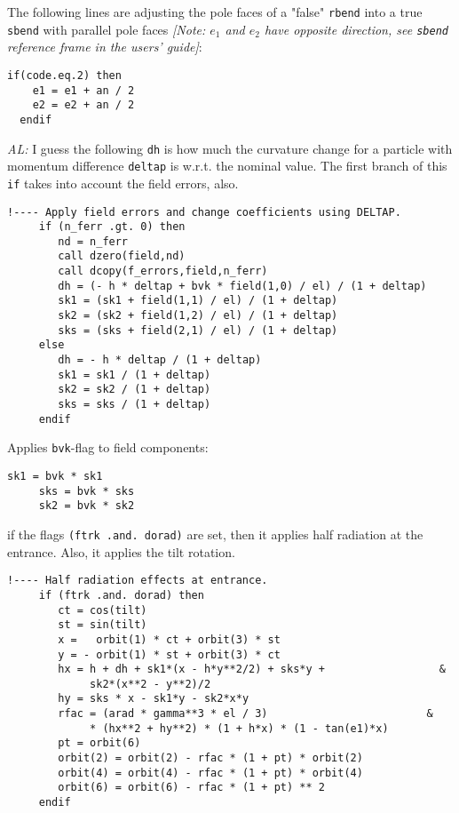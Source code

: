 \documentclass{cern-art} %
\renewcommand{\L}[1]{\lstinline[firstnumber=last]{#1}}
\begin{document}
The following lines are adjusting the pole faces of a "false" \L{rbend} into a true \L{sbend} with parallel pole faces {\em [Note: $e_1$ and $e_2$ have opposite direction, see \L{sbend} reference frame in the users' guide]}:
\begin{lstlisting}[firstnumber=last]
  if(code.eq.2) then
    e1 = e1 + an / 2
    e2 = e2 + an / 2
  endif
\end{lstlisting}
{\em AL:} I guess the following \L{dh} is how much the curvature change for a particle with momentum difference \L{deltap} is w.r.t. the nominal value. The first branch of this \L{if} takes into account the field errors, also.
  \begin{lstlisting}[firstnumber=last]
     !---- Apply field errors and change coefficients using DELTAP.
     if (n_ferr .gt. 0) then
        nd = n_ferr
        call dzero(field,nd)
        call dcopy(f_errors,field,n_ferr)
        dh = (- h * deltap + bvk * field(1,0) / el) / (1 + deltap)
        sk1 = (sk1 + field(1,1) / el) / (1 + deltap)
        sk2 = (sk2 + field(1,2) / el) / (1 + deltap)
        sks = (sks + field(2,1) / el) / (1 + deltap)
     else
        dh = - h * deltap / (1 + deltap)
        sk1 = sk1 / (1 + deltap)
        sk2 = sk2 / (1 + deltap)
        sks = sks / (1 + deltap)
     endif
  \end{lstlisting}
Applies \L{bvk}-flag to field components:
 \begin{lstlisting}[firstnumber=last]
     sk1 = bvk * sk1
     sks = bvk * sks
     sk2 = bvk * sk2
  \end{lstlisting}
  if the flags \L{(ftrk .and. dorad)} are set, then it applies half radiation at the entrance. Also, it applies the tilt rotation.
 \begin{lstlisting}[firstnumber=last]
     !---- Half radiation effects at entrance.
     if (ftrk .and. dorad) then
        ct = cos(tilt)
        st = sin(tilt)
        x =   orbit(1) * ct + orbit(3) * st
        y = - orbit(1) * st + orbit(3) * ct
        hx = h + dh + sk1*(x - h*y**2/2) + sks*y +                  &
             sk2*(x**2 - y**2)/2
        hy = sks * x - sk1*y - sk2*x*y
        rfac = (arad * gamma**3 * el / 3)                         &
             * (hx**2 + hy**2) * (1 + h*x) * (1 - tan(e1)*x)
        pt = orbit(6)
        orbit(2) = orbit(2) - rfac * (1 + pt) * orbit(2)
        orbit(4) = orbit(4) - rfac * (1 + pt) * orbit(4)
        orbit(6) = orbit(6) - rfac * (1 + pt) ** 2
     endif
  \end{lstlisting}
\end{document}
